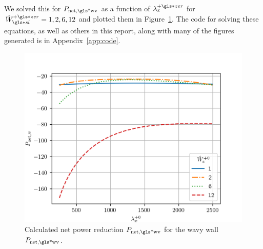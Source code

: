 We solved this for $P_\text{net,\gls*{wv}} $ as a function of $\lambda_x\pz$ for $\hat{W}\ssl\pz=1,2,6,12$ and plotted them in Figure~\ref{fig:pnetww}. The code for solving these equations, as well as others in this report, along with many of the figures generated is in Appendix~\ref{app:code}.
\begin{figure}[htbp]
	\centering
	\includegraphics[width=0.7\linewidth]{project/fig/pnetww.png}
	\caption[Net power reduction for the wavy wall $P_\text{net,w}$]{Calculated net power reduction $P_\text{net,\gls*{wv}} $ for the wavy wall $P_\text{net,\gls*{wv}} $.}
	\label{fig:pnetww}
\end{figure}
